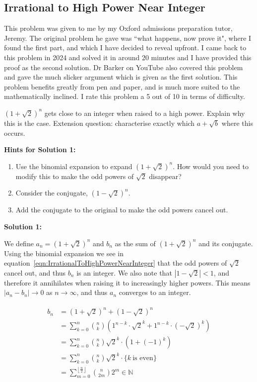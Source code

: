 \subsection{Irrational to High Power Near Integer}

This problem was given to me by my Oxford admissions preparation tutor, Jeremy. The original problem he gave was ``what happens, now prove it", where I found the first part, and which I have decided to reveal upfront. I came back to this problem in 2024 and solved it in around 20 minutes and I have provided this proof as the second solution. Dr Barker on YouTube also covered this problem and gave the much slicker argument which is given as the first solution. This problem benefits greatly from pen and paper, and is much more suited to the mathematically inclined. I rate this problem a 5 out of 10 in terms of difficulty.

$(1 + \sqrt{2})^n$ gets close to an integer when raised to a high power. Explain why this is the case. Extension question: characterise exactly which $a + \sqrt{b}$ where this occurs.

\textbf{Hints for Solution 1:}

\begin{enumerate}
    \item Use the binomial expansion to expand $\left( 1 + \sqrt{2} \right)^n$. How would you need to modify this to make the odd powers of $\sqrt{2}$ disappear?
    \item Consider the conjugate, $\left( 1 - \sqrt{2} \right)^n$.
    \item Add the conjugate to the original to make the odd powers cancel out.
\end{enumerate}

\textbf{Solution 1:}

We define $a_n = \left( 1 + \sqrt{2} \right)^n$ and $b_n$ as the sum of $\left (1 + \sqrt{2} \right)^n$ and its conjugate. Using the binomial expansion we see in equation~\eqref{eqn:IrrationalToHighPowerNearInteger} that the odd powers of $\sqrt{2}$ cancel out, and thus $b_n$ is an integer. We also note that $\left| 1 - \sqrt{2} \right| < 1$, and therefore it annihilates when raising it to increasingly higher powers. This means $|a_n - b_n| \to 0$ as $n \to \infty$, and thus $a_n$ converges to an integer.

\begin{align}
	\begin{split}
		b_n &= \left( 1 + \sqrt{2} \right)^n + \left( 1 - \sqrt{2} \right)^n  \\
		&= \sum_{k=0}^n {n \choose k} \left( 1^{n - k} \cdot \sqrt{2}^k + 1^{n - k} \cdot (-\sqrt{2})^k \right)  \\
		&= \sum_{k=0}^n {n \choose k} \sqrt{2}^k \cdot (1 + (-1)^k)  \\
		&= \sum_{k=0}^n {n \choose k} \sqrt{2}^k \cdot \{k \ \text{is even}\}  \\
		&= \sum_{m=0}^{\left\lfloor \frac{n}{2} \right\rfloor} {n \choose 2m} 2^m \in \mathbb{N}
		\label{eqn:IrrationalToHighPowerNearInteger}
	\end{split}	
\end{align}


